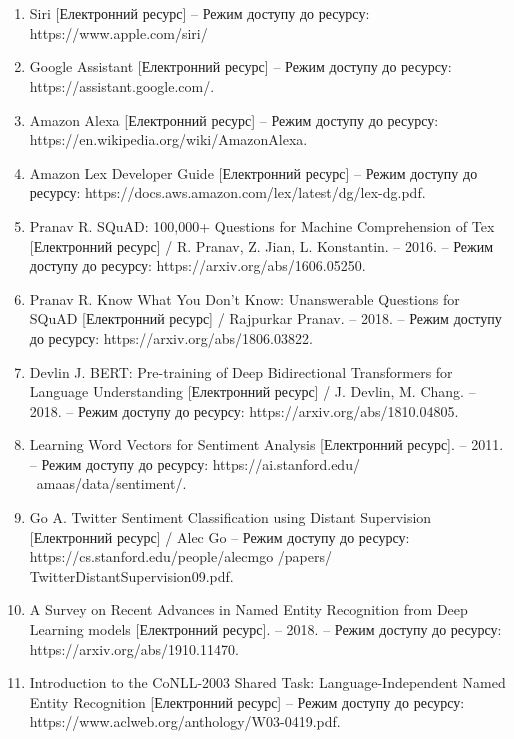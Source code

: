 \chapter*{\bibname}                       %
\begin{enumerate}
    
\item Siri [Електронний ресурс] – Режим доступу до ресурсу: https://www.apple.com/siri/
\item Google Assistant [Електронний ресурс] – Режим доступу до ресурсу: https://assistant.google.com/.
\item Amazon Alexa [Електронний ресурс] – Режим доступу до ресурсу: https://en.wikipedia.org/wiki/AmazonAlexa.
\item Amazon Lex Developer Guide [Електронний ресурс] – Режим доступу до ресурсу: https://docs.aws.amazon.com/lex/latest/dg/lex-dg.pdf.
\item Pranav R. SQuAD: 100,000+ Questions for Machine Comprehension of Tex [Електронний ресурс] / R. Pranav, Z. Jian, L. Konstantin. – 2016. – Режим доступу до ресурсу: https://arxiv.org/abs/1606.05250.
\item Pranav R. Know What You Don't Know: Unanswerable Questions for SQuAD [Електронний ресурс] / Rajpurkar Pranav. – 2018. – Режим доступу до ресурсу: https://arxiv.org/abs/1806.03822.
\item Devlin J. BERT: Pre-training of Deep Bidirectional Transformers for Language Understanding [Електронний ресурс] / J. Devlin, M. Chang. – 2018. – Режим доступу до ресурсу: https://arxiv.org/abs/1810.04805.
\item Learning Word Vectors for Sentiment Analysis [Електронний ресурс]. – 2011. – Режим доступу до ресурсу: https://ai.stanford.edu/ ~amaas/data/sentiment/.
\item Go A. Twitter Sentiment Classification using Distant Supervision [Електронний ресурс] / Alec Go – Режим доступу до ресурсу: https://cs.stanford.edu/people/alecmgo /papers/ TwitterDistantSupervision09.pdf.
\item A Survey on Recent Advances in Named Entity Recognition from Deep Learning models [Електронний ресурс]. – 2018. – Режим доступу до ресурсу: https://arxiv.org/abs/1910.11470.
\item Introduction to the CoNLL-2003 Shared Task: Language-Independent Named Entity Recognition [Електронний ресурс] – Режим доступу до ресурсу: https://www.aclweb.org/anthology/W03-0419.pdf.

\end{enumerate}
